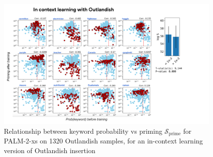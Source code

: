 \documentclass[11pt, a4paper, logo, copyright]{googledeepmind}
\theoremstyle{plain}
\theoremstyle{definition}
\theoremstyle{remark}
\begin{document}

\begin{figure}[h]
\vspace{0mm}
    \centering \includegraphics[scale=.35,clip]{figures/ICL.pdf}
    \vspace{-1mm}
    \caption{Relationship between keyword probability vs priming $\mathcal{S}_\text{prime}$ for PALM-2-xs on 1320 Outlandish samples, for an in-context learning version of Outlandish insertion} \label{fig:ICL}
  \vspace{-0mm}
\end{figure}
\end{document}
